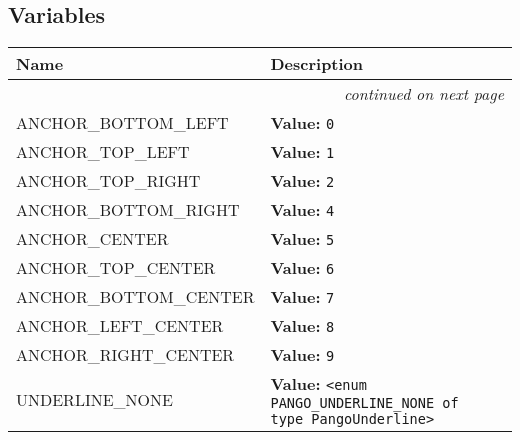 
  \subsection{Variables}

    \vspace{-1cm}
\hspace{\varindent}\begin{longtable}{|p{\varnamewidth}|p{\vardescrwidth}|l}
\cline{1-2}
\cline{1-2} \centering \textbf{Name} & \centering \textbf{Description}& \\
\cline{1-2}
\endhead\cline{1-2}\multicolumn{3}{r}{\small\textit{continued on next page}}\\\endfoot\cline{1-2}
\endlastfoot\raggedright A\-N\-C\-H\-O\-R\-\_\-B\-O\-T\-T\-O\-M\-\_\-L\-E\-F\-T\- & \raggedright \textbf{Value:} 
{\tt 0}&\\
\cline{1-2}
\raggedright A\-N\-C\-H\-O\-R\-\_\-T\-O\-P\-\_\-L\-E\-F\-T\- & \raggedright \textbf{Value:} 
{\tt 1}&\\
\cline{1-2}
\raggedright A\-N\-C\-H\-O\-R\-\_\-T\-O\-P\-\_\-R\-I\-G\-H\-T\- & \raggedright \textbf{Value:} 
{\tt 2}&\\
\cline{1-2}
\raggedright A\-N\-C\-H\-O\-R\-\_\-B\-O\-T\-T\-O\-M\-\_\-R\-I\-G\-H\-T\- & \raggedright \textbf{Value:} 
{\tt 4}&\\
\cline{1-2}
\raggedright A\-N\-C\-H\-O\-R\-\_\-C\-E\-N\-T\-E\-R\- & \raggedright \textbf{Value:} 
{\tt 5}&\\
\cline{1-2}
\raggedright A\-N\-C\-H\-O\-R\-\_\-T\-O\-P\-\_\-C\-E\-N\-T\-E\-R\- & \raggedright \textbf{Value:} 
{\tt 6}&\\
\cline{1-2}
\raggedright A\-N\-C\-H\-O\-R\-\_\-B\-O\-T\-T\-O\-M\-\_\-C\-E\-N\-T\-E\-R\- & \raggedright \textbf{Value:} 
{\tt 7}&\\
\cline{1-2}
\raggedright A\-N\-C\-H\-O\-R\-\_\-L\-E\-F\-T\-\_\-C\-E\-N\-T\-E\-R\- & \raggedright \textbf{Value:} 
{\tt 8}&\\
\cline{1-2}
\raggedright A\-N\-C\-H\-O\-R\-\_\-R\-I\-G\-H\-T\-\_\-C\-E\-N\-T\-E\-R\- & \raggedright \textbf{Value:} 
{\tt 9}&\\
\cline{1-2}
\raggedright U\-N\-D\-E\-R\-L\-I\-N\-E\-\_\-N\-O\-N\-E\- & \raggedright \textbf{Value:} 
{\tt {\textless}enum PANGO\_UNDERLINE\_NONE of type PangoUnderline{\textgreater}}&\\

\end{longtable}
